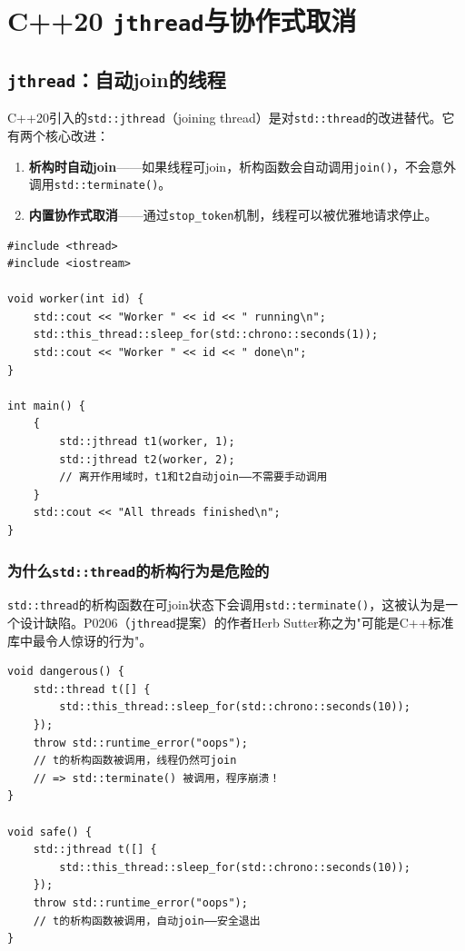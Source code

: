 \documentclass[12pt,a4paper,fontset=fandol]{ctexbook}
\newcommand{\cpp}[1]{C++#1}
\begin{document}
\part{\cpp{}20 \texttt{jthread}与协作式取消}

\chapter{\texttt{jthread}：自动join的线程}

\cpp{}20引入的\texttt{std::jthread}（joining thread）是对\texttt{std::thread}的改进替代。它有两个核心改进：
\begin{enumerate}[nosep]
\item \textbf{析构时自动join}——如果线程可join，析构函数会自动调用\texttt{join()}，不会意外调用\texttt{std::terminate()}。
\item \textbf{内置协作式取消}——通过\texttt{stop\_token}机制，线程可以被优雅地请求停止。
\end{enumerate}

\begin{lstlisting}
#include <thread>
#include <iostream>

void worker(int id) {
    std::cout << "Worker " << id << " running\n";
    std::this_thread::sleep_for(std::chrono::seconds(1));
    std::cout << "Worker " << id << " done\n";
}

int main() {
    {
        std::jthread t1(worker, 1);
        std::jthread t2(worker, 2);
        // 离开作用域时，t1和t2自动join——不需要手动调用
    }
    std::cout << "All threads finished\n";
}
\end{lstlisting}

\section{为什么\texttt{std::thread}的析构行为是危险的}

\texttt{std::thread}的析构函数在可join状态下会调用\texttt{std::terminate()}，这被认为是一个设计缺陷。P0206（\texttt{jthread}提案）的作者Herb Sutter称之为"可能是\cpp{}标准库中最令人惊讶的行为"。

\begin{lstlisting}
void dangerous() {
    std::thread t([] {
        std::this_thread::sleep_for(std::chrono::seconds(10));
    });
    throw std::runtime_error("oops");
    // t的析构函数被调用，线程仍然可join
    // => std::terminate() 被调用，程序崩溃！
}

void safe() {
    std::jthread t([] {
        std::this_thread::sleep_for(std::chrono::seconds(10));
    });
    throw std::runtime_error("oops");
    // t的析构函数被调用，自动join——安全退出
}
\end{lstlisting}
\end{document}
